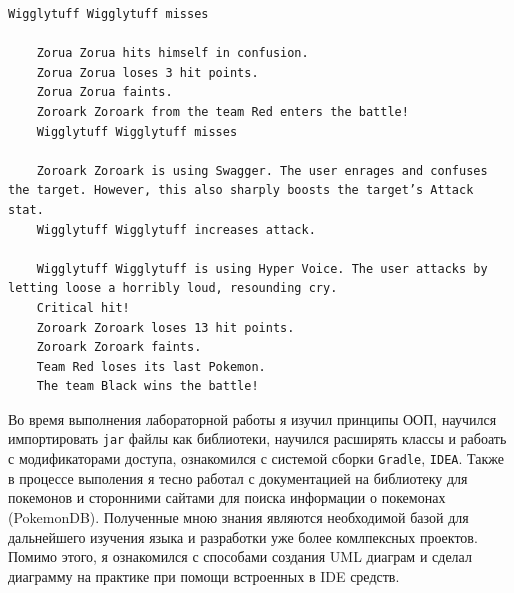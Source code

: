 \begin{lstlisting}[caption={Результат выполнения программы},label={lst:result}]
    Wigglytuff Wigglytuff misses

    Zorua Zorua hits himself in confusion.
    Zorua Zorua loses 3 hit points.
    Zorua Zorua faints.
    Zoroark Zoroark from the team Red enters the battle!
    Wigglytuff Wigglytuff misses

    Zoroark Zoroark is using Swagger. The user enrages and confuses the target. However, this also sharply boosts the target’s Attack stat.
    Wigglytuff Wigglytuff increases attack.

    Wigglytuff Wigglytuff is using Hyper Voice. The user attacks by letting loose a horribly loud, resounding cry.
    Critical hit!
    Zoroark Zoroark loses 13 hit points.
    Zoroark Zoroark faints.
    Team Red loses its last Pokemon.
    The team Black wins the battle!
    \end{lstlisting}

    Во время выполнения лабораторной работы я изучил принципы ООП, научился импортировать \verb|jar| файлы как библиотеки, научился расширять классы и рабоать с модификаторами доступа, ознакомился с системой сборки \verb|Gradle|, \verb|IDEA|. Также в процессе выполения я тесно работал с документацией\cite{sedoc} на библиотеку для покемонов и сторонними сайтами для поиска информации о покемонах (PokemonDB\cite{pokemondb}). Полученные мною знания являются необходимой базой для дальнейшего изучения языка и разработки уже более комлпексных проектов.\\
    Помимо этого, я ознакомился с способами создания UML диаграм и сделал диаграмму на практике при помощи встроенных в IDE средств.
    \newpage





